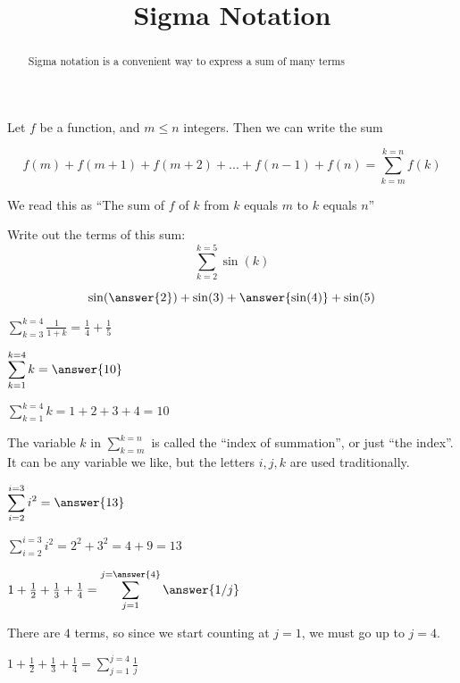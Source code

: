 \documentclass{ximera}
\title[Dig-In:]{Sigma Notation}
\begin{document}
\begin{abstract}
	Sigma notation is a convenient way to express a sum of many terms
\end{abstract}

\begin{definition}
	Let $f$ be a function, and $m \leq n$ integers.  Then we can write the sum 
	
	\[ f(m)+f(m+1)+f(m+2)+...+f(n-1)+f(n) = \displaystyle\sum_{k=m}^{k=n} f(k)\] 
	
	We read this as ``The sum of $f$ of $k$ from $k$ equals $m$ to $k$ equals $n$''
	
	\end{definition}

\begin{example}
  Write out the terms of this sum:
  \[
  \displaystyle\sum_{k=2}^{k=5} \sin(k)
  \]
  \begin{explanation}
  \begin{prompt}
    \[
    \sin(\answer{2}) + \sin(3) + \answer{\sin(4)} + \sin(5)
    \]
  \end{prompt}

  \end{explanation}
\end{example}

\begin{example}
$\displaystyle\sum_{k=3}^{k=4} \frac{1}{1+k} = \frac{1}{4}+\frac{1}{5}$
\end{example}

\begin{question}
	$\displaystyle\sum_{k=1}^{k=4} k  = \answer{10}$
	\begin{hint}
		$\displaystyle\sum_{k=1}^{k=4} k  = 1+2+3+4=10$
	\end{hint}
\end{question}

The variable $k$ in $\displaystyle\sum_{k=m}^{k=n}$ is called the ``index of summation'', or just ``the index''.  It can be any variable we like, but the letters $i,j,k$ are used traditionally.

\begin{question}
$\displaystyle\sum_{i=2}^{i=3} i^2  = \answer{13}$
\begin{hint}
	$\displaystyle\sum_{i=2}^{i=3} i^2  = 2^2+3^2 = 4+9=13$
\end{hint}
\end{question}

\begin{question}
	$1+\frac{1}{2} + \frac{1}{3} + \frac{1}{4} = \displaystyle\sum_{j=1}^{j= \answer{4}} \answer{1/j}$
	\begin{hint}
		There are $4$ terms, so since we start counting at $j=1$, we must go up to $j=4$.
	\end{hint}
	\begin{hint}
		$1+\frac{1}{2} + \frac{1}{3} + \frac{1}{4} = \displaystyle\sum_{j=1}^{j= 4} \frac{1}{j}$
	\end{hint}
\end{question}
\end{document}
